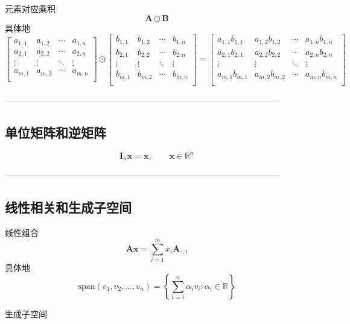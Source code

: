 \documentclass{article}
\begin{document}
元素对应乘积
$$
\mathbf{A} \odot \mathbf{B}
$$
具体地
$$
\begin{bmatrix}
a_{1,1} & a_{1,2} & \cdots & a_{1,n} \\
a_{2,1} & a_{2,2} & \cdots & a_{2,n} \\
\vdots & \vdots & \ddots & \vdots \\
a_{m,1} & a_{m,2} & \cdots & a_{m,n} \\
\end{bmatrix}
\odot
\begin{bmatrix}
b_{1,1} & b_{1,2} & \cdots & b_{1,n} \\
b_{2,1} & b_{2,2} & \cdots & b_{2,n} \\
\vdots & \vdots & \ddots & \vdots \\
b_{m,1} & b_{m,2} & \cdots & b_{m,n} \\
\end{bmatrix}
=
\begin{bmatrix}
a_{1,1} b_{1,1} & a_{1,2} b_{1,2} & \cdots & a_{1,n} b_{1,n} \\
a_{2,1} b_{2,1} & a_{2,2} b_{2,2} & \cdots & a_{2,n} b_{2,n} \\
\vdots & \vdots & \ddots & \vdots \\
a_{m,1} b_{m,1} & a_{m,2} b_{m,2} & \cdots & a_{m,n} b_{m,n} \\
\end{bmatrix}
$$

--------------------------------------------------------------------------------------------------

\subsection{单位矩阵和逆矩阵}
\[
\boldsymbol{I}_n\boldsymbol{x}=\boldsymbol{x}, \qquad \boldsymbol{x} \in \mathbb{R}^n
\]

--------------------------------------------------------------------------------------------------

\subsection{线性相关和生成子空间}
线性组合
$$
\mathbf{Ax} = \sum_{i=1}^{m} x_i\mathbf{A}_{:,i}
$$
具体地
\begin{equation*}
    \mathrm{span}(v_1, v_2, \dots, v_n) = \left\{ \sum_{i=1}^n \alpha_i v_i : \alpha_i \in \mathbb{R} \right\}
\end{equation*}

生成子空间
\end{document}
